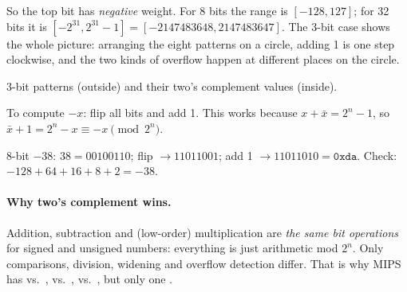 So the top bit has \emph{negative} weight. For 8 bits the range is $[-128,127]$; for 32 bits
it is $[-2^{31}, 2^{31}-1] = [-2147483648, 2147483647]$.
The 3-bit case shows the whole picture: arranging the eight patterns on a circle, adding 1 is
one step clockwise, and the two kinds of overflow happen at different places on the circle.

\begin{center}

\small 3-bit patterns (outside) and their two's complement values (inside).
\end{center}

\begin{important}
To compute $-x$: flip all bits and add 1. This works because
$x + \bar{x} = 2^n - 1$, so $\bar{x}+1 = 2^n - x \equiv -x \pmod{2^n}$.
\end{important}

\begin{example}
8-bit $-38$: $38 = 00100110$; flip $\to 11011001$; add 1 $\to 11011010 = \mathtt{0xda}$.
Check: $-128 + 64 + 16 + 8 + 2 = -38$.
\end{example}

\paragraph{Why two's complement wins.} Addition, subtraction and (low-order) multiplication
are \emph{the same bit operations} for signed and unsigned numbers: everything is just
arithmetic mod $2^n$. Only comparisons, division, widening and overflow detection differ.
That is why MIPS has  vs.\ ,  vs.\ ,
 vs.\ , but only one .

